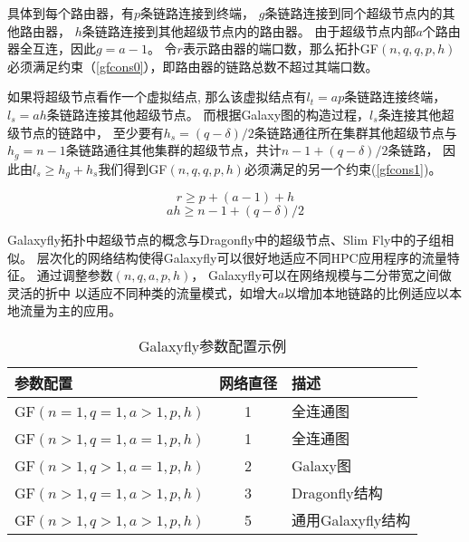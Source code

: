 具体到每个路由器，有$p$条链路连接到终端，
$g$条链路连接到同个超级节点内的其他路由器，
$h$条链路连接到其他超级节点内的路由器。
由于超级节点内部$a$个路由器全互连，因此$g=a-1$。
令$r$表示路由器的端口数，那么拓扑GF$(n,q,q,p,h)$
必须满足约束（\ref{gfcons0}），即路由器的链路总数不超过其端口数。

如果将超级节点看作一个虚拟结点,
那么该虚拟结点有$l_t=ap$条链路连接终端，$l_s=ah$条链路连接其他超级节点。
而根据Galaxy图的构造过程，$l_s$条连接其他超级节点的链路中，
至少要有$h_s=(q-\delta)/2$条链路通往所在集群其他超级节点与
$h_g=n-1$条链路通往其他集群的超级节点，共计$n-1+(q-\delta)/2$条链路，
因此由$l_s \ge h_g + h_s$我们得到GF$(n,q,q,p,h)$必须满足的另一个约束(\ref{gfcons1})。

\begin{equation}\label{gfcons0}
  r \ge p+(a-1)+h
\end{equation}
\begin{equation}\label{gfcons1}
  ah \ge n-1+(q-\delta)/2
\end{equation}


Galaxyfly拓扑中超级节点的概念与Dragonfly中的超级节点、Slim Fly中的子组相似。
层次化的网络结构使得Galaxyfly可以很好地适应不同HPC应用程序的流量特征。
通过调整参数$(n,q,a,p,h)$，
Galaxyfly可以在网络规模与二分带宽之间做灵活的折中
以适应不同种类的流量模式，如增大$a$以增加本地链路的比例适应以本地流量为主的应用。

\begin{table}
  \centering
  \caption{Galaxyfly参数配置示例}
  \label{tab:gfexample}
  \begin{tabular}{lcl}
    \toprule
    参数配置 & 网络直径 & 描述 \\
    \midrule
    GF$(n\!\!=\!\!1,q\!\!=\!\!1,a\!\!>\!\!1,p,h)$ & 1 & 全连通图\\
    GF$(n\!\!>\!\!1,q\!\!=\!\!1,a\!\!=\!\!1,p,h)$ & 1 & 全连通图\\
    GF$(n\!\!>\!\!1,q\!\!>\!\!1,a\!\!=\!\!1,p,h)$ & 2 & Galaxy图\\
    GF$(n\!\!>\!\!1,q\!\!=\!\!1,a\!\!>\!\!1,p,h)$ & 3 & Dragonfly结构\\
    GF$(n\!\!>\!\!1,q\!\!>\!\!1,a\!\!>\!\!1,p,h)$ & 5 & 通用Galaxyfly结构\\
    \bottomrule
  \end{tabular}
\end{table}

